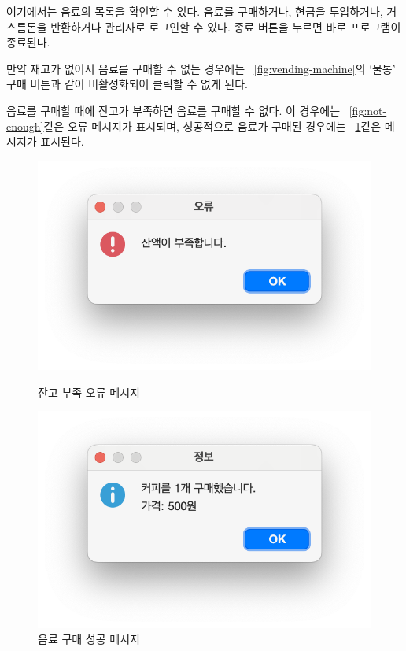 \documentclass{oblivoir}
\newcommand{\figref}[1]{\figurename~\ref{#1}}
\begin{document}
    여기에서는 음료의 목록을 확인할 수 있다.
    음료를 구매하거나, 현금을 투입하거나, 거스름돈을 반환하거나 관리자로 로그인할 수 있다.
    종료 버튼을 누르면 바로 프로그램이 종료된다.

    만약 재고가 없어서 음료를 구매할 수 없는 경우에는 \figref{fig:vending-machine}의 `물통' 구매 버튼과 같이
    비활성화되어 클릭할 수 없게 된다.

    음료를 구매할 때에 잔고가 부족하면 음료를 구매할 수 없다. 이 경우에는 \figref{fig:not-enough}\와 같은 오류 메시지가 표시되며,
    성공적으로 음료가 구매된 경우에는 \figref{fig:bought-coffee}\와 같은 메시지가 표시된다.
    \begin{figure}[h]
        \centering
        \begin{minipage}{.5\textwidth}
            \includegraphics[width=\textwidth]{images/snapshot/not-enough}
            \caption{잔고 부족 오류 메시지}
            \label{fig:not-enough}
        \end{minipage}%
        \begin{minipage}{.5\textwidth}
            \includegraphics[width=\textwidth]{images/snapshot/bought-coffee}
            \caption{음료 구매 성공 메시지}
            \label{fig:bought-coffee}
        \end{minipage}
    \end{figure}
\end{document}
